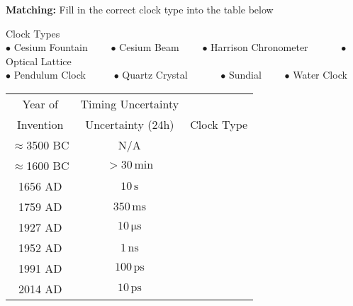 \documentclass[11pt]{exam}
\newcommand{\unit}[1]{\ensuremath{\, \mathrm{#1}}}
\begin{document}
\begin{questions}
\addpoints

\question[8]\textbf{Matching:} Fill in the correct clock type into the table below
\addpoints

\begin{center}
\Large
Clock Types\\
\normalsize
$\bullet$ Cesium Fountain \ \ \ \ $\bullet$ Cesium Beam \ \ \ \ $\bullet$ Harrison Chronometer \ \ \ \ \ \ $\bullet$ Optical Lattice\\
$\bullet$ Pendulum Clock \ \ \ \ \ $\bullet$ Quartz Crystal \ \ \ \ \ \ $\bullet$ Sundial \ \ \ \ $\bullet$ Water Clock
\end{center}

\begin{center}
\Large
\begin{tabular}{|c|c|c|}
\hline
Year of         &Timing Uncertainty         &          \\        
Invention       &Uncertainty (24h)          &Clock Type\\
\hline 
$\approx$3500 BC        &N/A                               &\hspace*{3.5in}\\
\hline 
$\approx$1600 BC        &$>30\unit{min}$                   &\hspace*{3.5in}\\
\hline
1656 AD                 &$10\unit{s}$                      &\hspace*{3.5in}\\
\hline
1759 AD                 &$350\unit{ms}$                    &\hspace*{3.5in}\\
\hline
1927 AD                 &$10\unit{\mu s}$                 &\hspace*{3.5in}\\
\hline
1952 AD                 &$1\unit{ns}$                      &\hspace*{3.5in}\\
\hline
1991 AD                 &$100\unit{ps}$                    &\hspace*{3.5in}\\
\hline
2014 AD                 &$10\unit{ps}$                     &\hspace*{3.5in}\\
\hline
\end{tabular} 
\end{center}

\normalsize


\end{questions}
\end{document}
